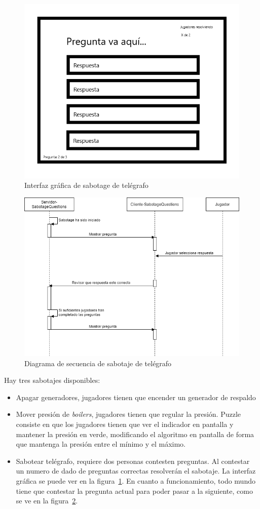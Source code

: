 \begin{figure}[h]
    \centering
    \includegraphics[width=0.5\linewidth]{images/sabotage_preguntas.png}
    \caption{Interfaz gráfica de sabotage de telégrafo}
    \label{fig:ui_teletransporte}
\end{figure}
\begin{figure}[h]
    \centering
    \includegraphics[width=1\linewidth]{images/diagrama_secuencia_sabotage_preguntas.png}
    \caption{Diagrama de secuencia de sabotaje de telégrafo}
    \label{fig:diagrama_secuencia_sabotage_pregunta}
\end{figure}

Hay tres sabotajes disponibles:
\begin{itemize}
    \item Apagar generadores, jugadores tienen que encender un generador de respaldo
    \item Mover presión de \textit{boilers}, jugadores tienen que regular la presión. Puzzle consiste en que los jugadores tienen que ver el indicador en pantalla y mantener la presión en verde, modificando el algoritmo en pantalla de forma que mantenga la presión entre el mínimo y el máximo.
    \item Sabotear telégrafo, requiere dos personas contesten preguntas. Al contestar un numero de dado de preguntas correctas resolverán el sabotaje. La interfaz gráfica se puede ver en la figura~\ref{fig:ui_teletransporte}. En cuanto a funcionamiento, todo mundo tiene que contestar la pregunta actual para poder pasar a la siguiente, como se ve en la figura~\ref{fig:diagrama_secuencia_sabotage_pregunta}.
\end{itemize}

